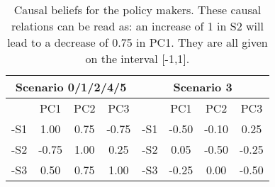 \documentclass[12pt]{article}
\begin{document}
\begin{table}[h!]
\begin{center}
\begin{tabular}{ |c|c|c|c| |c|c|c|c|}
 \hline
\multicolumn{4}{|c||}{Scenario 0/1/2/4/5}	& \multicolumn{4}{|c|}{Scenario 3}		\\ \hline
	& PC1	& PC2	& PC3		& 		& PC1	& PC2	& PC3	\\ \hline
-S1 	& 1.00	& 0.75	&-0.75		& -S1 	&-0.50	&-0.10	& 0.25	\\ \hline
-S2 	&-0.75	& 1.00	& 0.25 		& -S2 	& 0.05	&-0.50	&-0.25 	\\ \hline
-S3 	& 0.50	& 0.75	& 1.00		& -S3 	&-0.25	& 0.00	&-0.50	\\ 
 \hline
\end{tabular}
\end{center}
\caption{Causal beliefs for the policy makers. These causal relations can be read as: an increase of 1 in S2 will lead to a decrease of 0.75 in PC1. They are all given on the interval [-1,1].}
\label{tab:causalBeliefs}
\end{table}
\end{document}
